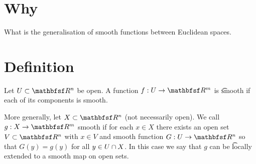 
\section*{Why}

What is the generalisation of smooth functions between Euclidean spaces.

\section*{Definition}

Let $U \subset \R ^n$ be open.
A function $f: U \to \R ^m$ is \t{smooth} if each of its components is smooth.

More generally, let $X \subset \R ^n$ (not necessarily open).
We call $g: X \to \R ^m$ smooth if for each $x \in X$ there exists an open set $V \subset \R ^n$ with $x \in V$ and smooth function $G: U \to \R ^n$ so that $G(y) = g(y)$ for all $y \in U \cap X$.
In this case we say that $g$ can be \t{locally extended} to a smooth map on open sets.

\blankpage